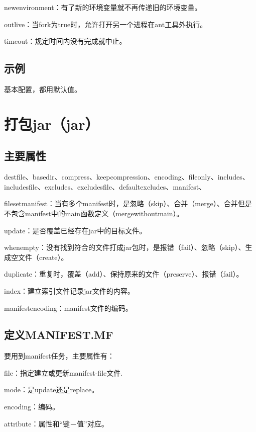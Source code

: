 newenvironment：有了新的环境变量就不再传递旧的环境变量。

outlive：当fork为true时，允许打开另一个进程在ant工具外执行。

timeout：规定时间内没有完成就中止。

\subsection{示例}

基本配置，都用默认值。








\section{打包jar（jar）}

\subsection{主要属性}

destfile、basedir、compress、keepcompression、encoding、fileonly、includes、includesfile、excludes、excludesfile、defaultexcludes、manifest、

filesetmanifest：当有多个manifest时，是忽略（skip）、合并（merge）、合并但是不包含manifest中的main函数定义（mergewithoutmain）。

update：是否覆盖已经存在jar中的目标文件。

whenempty：没有找到符合的文件打成jar包时，是报错（fail）、忽略（skip）、生成空文件（create）。

duplicate：重复时，覆盖（add）、保持原来的文件（preserve）、报错（fail）。

index：建立索引文件记录jar文件的内容。

manifestencoding：manifest文件的编码。

\subsection{定义MANIFEST.MF}

要用到manifest任务，主要属性有：

file：指定建立或更新manifest-file文件.

mode：是update还是replace。

encoding：编码。

attribute：属性和“键－值”对应。

